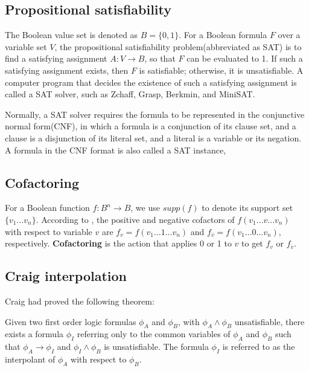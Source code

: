 \documentclass{sig-alternate}
\begin{document}
\subsection{Propositional satisfiability}\label{subsec_SAT}
The Boolean value set is denoted as $B=\{0,1\}$.
For a Boolean formula $F$ over a variable set $V$,
the propositional satisfiability problem(abbreviated as SAT) is to find a satisfying assignment $A:V\to B$,
so that $F$ can be evaluated to 1.
If such a satisfying assignment exists, then $F$ is satisfiable;
otherwise,
it is unsatisfiable.
A computer program that decides the existence of such a satisfying assignment is called a SAT solver,
 such as Zchaff\cite{CHAFF},
 Grasp\cite{grasp},
 Berkmin\cite{BERKMIN},
 and MiniSAT\cite{EXTSAT}.

Normally,
a SAT solver requires the formula to be represented in the conjunctive normal form(CNF),
in which a formula is a conjunction of its clause set,
and a clause is a disjunction of its literal set,
and a literal is a variable or its negation.
A formula in the CNF format is also called a SAT instance,


\subsection{Cofactoring}\label{subsec_pre_cofact}

For a Boolean function $f:B^n\to B$,
we use $supp(f)$ to denote its support set $\{v_1\dots v_n\}$.
According to \cite{Cofact},
the positive and negative cofactors of $f(v_1\dots v\dots v_n)$ with respect to variable
$v$ are $f_v=f(v_1\dots 1\dots v_n)$ and $f_{\overline{v}}=f(v_1\dots 0\dots v_n)$,
respectively.
\textbf{Cofactoring} is the action that applies 0 or 1 to $v$ to get $f_v$ or $f_{\overline{v}}$.


\subsection{Craig interpolation}\label{subsec_pre_interp}
Craig\cite{Craig} had proved the following theorem:

\begin{theorem}\label{thm_craig}
Given two first order logic formulas $\phi_A$ and $\phi_B$,
with $\phi_A\wedge \phi_B$ unsatisfiable,
there exists a formula $\phi_I$ referring only
to the common variables of $\phi_A$ and $\phi_B$ such that $\phi_A\to \phi_I$
and $\phi_I\wedge \phi_B$ is unsatisfiable.
The formula $\phi_I$ is referred to as the interpolant of $\phi_A$ with respect to $\phi_B$.
\end{theorem}
\end{document}

